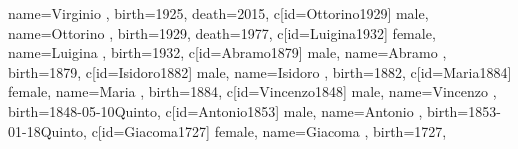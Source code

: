 \documentclass{article}
\begin{document}
\begin{midpage}
\begin{center}
\begin{genealogypicture}
{{{{{{{{{                                    name={Virginio },
                                    birth={1925}{},
                                    death={2015}{},
                                }
                                c[id=Ottorino1929]{
                                    male,
                                    name={Ottorino },
                                    birth={1929}{},
                                    death={1977}{},
                                }
                                c[id=Luigina1932]{
                                    female,
                                    name={Luigina },
                                    birth={1932}{},
                                }
                            }
                            c[id=Abramo1879]{
                                male,
                                name={Abramo },
                                birth={1879}{},
                            }
                            c[id=Isidoro1882]{
                                male,
                                name={Isidoro },
                                birth={1882}{},
                            }
                            c[id=Maria1884]{
                                female,
                                name={Maria },
                                birth={1884}{},
                            }
                        }
                        c[id=Vincenzo1848]{
                            male,
                            name={Vincenzo },
                            birth={1848-05-10}{Quinto},
                        }
                        c[id=Antonio1853]{
                            male,
                            name={Antonio },
                            birth={1853-01-18}{Quinto},
                        }
                    }
                }
            }
            c[id=Giacoma1727]{
                female,
                name={Giacoma },
                birth={1727}{},
            }
        }
    }
}
\end{genealogypicture}

\end{center}
\end{midpage}
\end{document}

